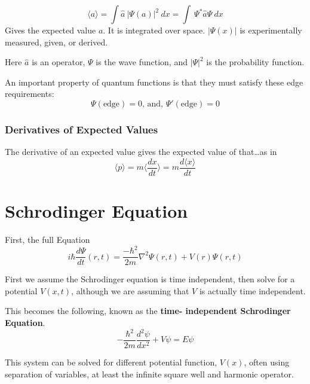 \begin{equation}
  \langle a \rangle = \int \hat{a}~|\Psi(a)|^2~dx=\int~\Psi^{*}\hat{a}\Psi~dx
\end{equation}
Gives the expected value $ a $. It is integrated over space. $ |\Psi(x)| $ is experimentally measured, given, or derived.

Here $ \hat{a} $ is  an operator, $ \Psi $ is the wave function, and $ |\Psi|^2 $ is the probability function.

An important property of quantum functions is that they must satisfy these edge requirements:
\begin{equation}
 \Psi(\text{edge}) =0\text{, and, } \Psi'(\text{edge})=0
\end{equation}


\subsubsection{Derivatives of Expected Values}

The derivative of an expected value gives the expected value of that\ldots as in
\begin{equation}
  \langle p\rangle = m \langle \frac{dx}{dt}\rangle = m \frac{d\langle x\rangle}{dt}
\end{equation}





\section{Schrodinger Equation}
First, the full Equation
\begin{equation}
  i\hbar \frac{d\Psi}{dt}(r,t)=\frac{-\hbar^2}{2m}\nabla^2\Psi(r,t)+V(r)\Psi(r,t)
\end{equation}



First we assume the Schrodinger equation is time independent, then solve for a potential $ V (x,t) $, although we are assuming that $ V $ is actually time independent.

This becomes the following, known as the \textbf{time\-- independent Schrodinger Equation}.
\begin{equation}
  -\frac{\hbar^2}{2m}\frac{d^2\psi}{dx^2}+V\psi=E\psi
\end{equation}

This system can be solved for different potential function, $ V(x) $, often using separation of variables, at least the infinite square well and harmonic operator. 

